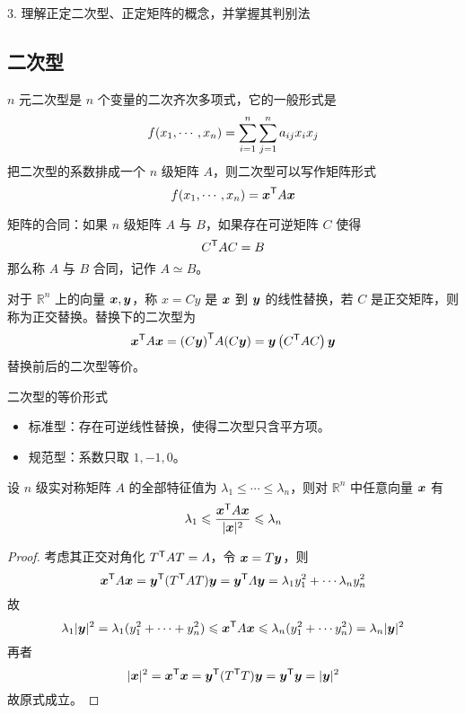 3. 理解正定二次型、正定矩阵的概念，并掌握其判别法

\subsection{二次型}

\newcommand{\xAx}{\transpose{\vbf{x}}A\vbf{x}}

\begin{definition}[二次型]
	$n$ 元二次型是 $n$ 个变量的二次齐次多项式，它的一般形式是
	\[f(x_1,\cdots,x_n) = \sum_{i=1}^n\sum_{j=1}^na_{ij}x_ix_j\]
	把二次型的系数排成一个 $n$ 级矩阵 $A$，则二次型可以写作矩阵形式
	\[f(\seq{x}{n}) = \xAx\]
\end{definition}

矩阵的合同：如果 $n$ 级矩阵 $A$ 与 $B$，如果存在可逆矩阵 $C$ 使得
\[ {C}^\mathsf{T}AC = B \]
那么称 $A$ 与 $B$ 合同，记作 $A\simeq B$。

对于 $\mathbb{R}^n$ 上的向量 $\boldsymbol{x}, \boldsymbol{y}$，称 $x = Cy$ 是 $\boldsymbol{x}$ 到 $\boldsymbol{y}$ 的线性替换，若 $C$ 是正交矩阵，则称为正交替换。替换下的二次型为
\[ \xAx = \transpose{(C\vbf{y})} A (C\vbf{y}) = \vbf{y}\left(\transpose{C} A C\right)\vbf{y} \]
替换前后的二次型等价。

二次型的等价形式
\begin{itemize}
	\item 标准型：存在可逆线性替换，使得二次型只含平方项。
	\item 规范型：系数只取 $1,-1,0$。
\end{itemize}

\begin{theorem}
	设 $n$ 级实对称矩阵 $A$ 的全部特征值为 $\lambda_1 \leqslant \cdots \leqslant \lambda_n$，则对 $\mathbb{R}^n$ 中任意向量 $\boldsymbol{x}$ 有
	\[ \lambda_1 \leqslant \frac{\xAx}{|\vbf{x}|^2} \leqslant \lambda_n \]
\end{theorem}

\begin{proof}
	考虑其正交对角化 ${T}^\mathsf{T}AT = \varLambda$，令 $\boldsymbol{x} = T\boldsymbol{y}$，则
	\[ \xAx = \transpose{\vbf{y}} (\transpose{T}AT) \vbf{y}= \transpose{\vbf{y}} \varLambda \vbf{y} = \lambda_1 y_1^2 + \cdots \lambda_n y_n^2 \]
	故
	\[ \lambda_1 |\vbf{y}|^2 = \lambda_1(y_1^2 + \cdots + y_n^2) \leqslant \xAx \leqslant \lambda_n(y_1^2 + \cdots y_n^2) = \lambda_n |\vbf{y}|^2 \]
	再者
	\[ |\boldsymbol{x}|^2 = {\boldsymbol{x}}^\mathsf{T}\boldsymbol{x} = {\boldsymbol{y}}^\mathsf{T}({T}^\mathsf{T}T)\boldsymbol{y} = {\boldsymbol{y}}^\mathsf{T}\boldsymbol{y} = |\boldsymbol{y}|^2 \]
	故原式成立。
\end{proof}

